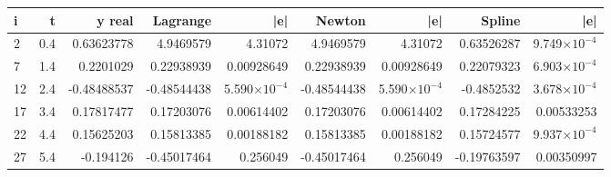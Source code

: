 {\footnotesize
\begin{longtable}{lrrrrrrrr}
\toprule
\textbf{i} & \textbf{t} & \textbf{y real} & \textbf{Lagrange} & \textbf{|e|} & \textbf{Newton} & \textbf{|e|} & \textbf{Spline} & \textbf{|e|} \\
\midrule
\endhead
2 & 0.4 & 0.63623778 & 4.9469579 & 4.31072 & 4.9469579 & 4.31072 & 0.63526287 & 9.749$\times10^{-4}$ \\
7 & 1.4 & 0.2201029 & 0.22938939 & 0.00928649 & 0.22938939 & 0.00928649 & 0.22079323 & 6.903$\times10^{-4}$ \\
12 & 2.4 & -0.48488537 & -0.48544438 & 5.590$\times10^{-4}$ & -0.48544438 & 5.590$\times10^{-4}$ & -0.4852532 & 3.678$\times10^{-4}$ \\
17 & 3.4 & 0.17817477 & 0.17203076 & 0.00614402 & 0.17203076 & 0.00614402 & 0.17284225 & 0.00533253 \\
22 & 4.4 & 0.15625203 & 0.15813385 & 0.00188182 & 0.15813385 & 0.00188182 & 0.15724577 & 9.937$\times10^{-4}$ \\
27 & 5.4 & -0.194126 & -0.45017464 & 0.256049 & -0.45017464 & 0.256049 & -0.19763597 & 0.00350997 \\
\bottomrule
\end{longtable}
}
